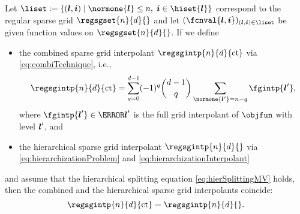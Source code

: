 \begin{theorem}
  \label{thm:combiTechnique}
  Let $\liset := \{(\*l, \*i) \mid
  \normone{\*l} \le n,\; \*i \in \hiset{\*l}\}$
  correspond to the regular sparse grid
  $\regsgset{n}{d}{}$ and let $(\fcnval{\*l,\*i})_{(\*l,\*i) \in \liset}$
  be given function values on $\regsgset{n}{d}{}$.
  If we define
  \begin{itemize}
    \item
    the combined sparse grid interpolant $\regsgintp{n}{d}{\ct}$ via
    \eqref{eq:combiTechnique}, i.e.,
    \begin{equation}
      \regsgintp{n}{d}{\ct}
      = \sum_{q=0}^{d-1} (-1)^q \binom{d-1}{q} \sum_{\normone{\*l'} = n-q}
      \fgintp{\*l'},
    \end{equation}
    where $\fgintp{\*l'} \in \ns{\*l'}$ is the full grid interpolant
    of $\objfun$ with level ${\boldsymbol{l}}'$, and
    
    \item
    the hierarchical sparse grid interpolant $\regsgintp{n}{d}{}$
    via \eqref{eq:hierarchizationProblem} and
    \eqref{eq:hierarchizationInterpolant}
  \end{itemize}
  and assume that the hierarchical splitting equation
  \eqref{eq:hierSplittingMV} holds,
  then the combined and the hierarchical sparse grid interpolants coincide:
  \begin{equation}
    \regsgintp{n}{d}{\ct}
    = \regsgintp{n}{d}{}.
  \end{equation}
\end{theorem}

